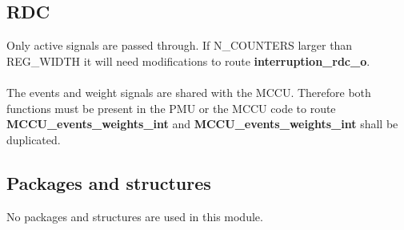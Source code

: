 \subsection{RDC}
Only active signals are passed through. If N\_COUNTERS larger than REG\_WIDTH it will need modifications to route \textbf{interruption\_rdc\_o}. \\
\\
The events and weight signals are shared with the MCCU. Therefore both functions must be present in the PMU or the MCCU code to route \textbf{MCCU\_events\_weights\_int} and \textbf{MCCU\_events\_weights\_int} shall be duplicated.

\subsection{Packages and structures}

No packages and structures are used in this module.

